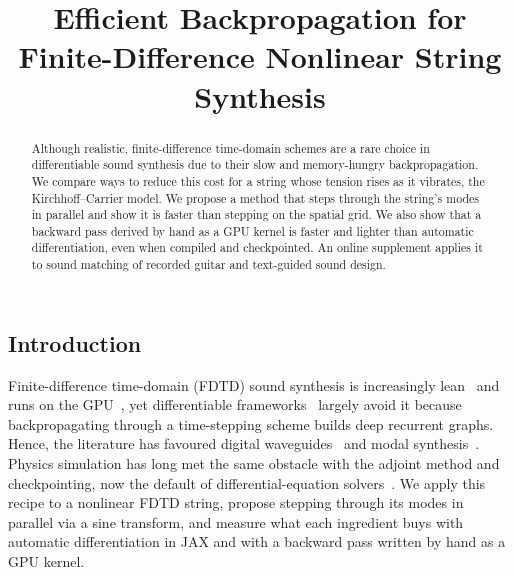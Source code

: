 \documentclass[a4paper]{article}
\title{Efficient Backpropagation for\\Finite-Difference Nonlinear String Synthesis}
\begin{document}
\ninept
\maketitle
\begin{sloppy}
\begin{abstract}
Although realistic, finite-difference time-domain schemes are a rare choice
in differentiable sound synthesis due to their slow and memory-hungry
backpropagation. We compare ways to reduce this cost for a string whose
tension rises as it vibrates, the Kirchhoff--Carrier model. We propose a
method that steps through the string's modes in parallel and show it is
faster than stepping on the spatial grid. We also show that a backward pass
derived by hand as a GPU kernel is faster and lighter than automatic
differentiation, even when compiled and checkpointed. An online
supplement applies it to sound matching of recorded guitar and
text-guided sound design.\footnotemark
\end{abstract}

\section{Introduction}
Finite-difference time-domain (FDTD) sound synthesis is increasingly lean~\cite{bilbao2024guitar} and runs on the GPU~\cite{lee2024string}, yet differentiable
frameworks~\cite{hayes2024review} largely avoid it because
backpropagating through a time-stepping scheme builds deep recurrent graphs. Hence, the literature has favoured
digital waveguides~\cite{tablas2026sound} and modal
synthesis~\cite{diaz2025}. Physics simulation has long met the same obstacle
with the adjoint method and checkpointing, now the default of
differential-equation solvers~\cite{kidger2021}.
We apply this recipe to a nonlinear FDTD string, propose stepping through
its modes in parallel via a sine transform, and measure what each ingredient
buys with automatic differentiation in JAX\footnotemark{} and with a backward
pass written by hand as a GPU kernel.


\end{sloppy}
\end{document}
